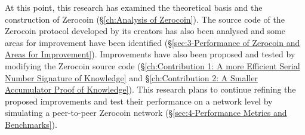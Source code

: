 At this point, this research has examined the theoretical basis and the construction of Zerocoin (\S\ref{ch:Analysis of Zerocoin}). The source code of the Zerocoin protocol developed by its creators has also been analysed and some areas for improvement have been identified (\S\ref{sec:3-Performance of Zerocoin and Areas for Improvement}). Improvements have also been proposed and tested by modifying the Zerocoin source code (\S\ref{ch:Contribution 1: A more Efficient Serial Number Signature of Knowledge} and \S\ref{ch:Contribution 2: A Smaller Accumulator Proof of Knowledge}). This research plans to continue refining the proposed improvements and test their performance on a network level by simulating a peer-to-peer Zerocoin network (\S\ref{sec:4-Performance Metrics and Benchmarks}). 